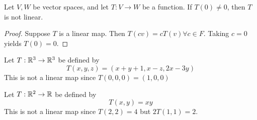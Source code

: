 \documentclass{article}
\begin{document}
\begin{theorem}
  Let $V, W$ be vector spaces, and let $T: V \to W$ be a function. If $T(0) \neq 0$, then $T$ is not linear.
\end{theorem}
\begin{proof}
  Suppose $T$ is a linear map. Then $T(cv) = cT(v) \forall c \in F$. Taking $c = 0$ yields $T(0) = 0$.
\end{proof}
\begin{example}
  Let $T: \mathbb{R}^3 \to \mathbb{R}^3$ be defined by \[
    T(x, y, z) = (x + y + 1, x-z, 2x-3y)
  \]
  This is not a linear map since $T(0, 0, 0) = (1, 0, 0)$
\end{example}
\begin{example}
  Let $T: \mathbb{R}^2 \to \mathbb{R}$ be defined by \[
    T(x, y) = xy
  \]
  This is not a linear map since $T(2, 2) = 4$ but $2T(1, 1) = 2$.
\end{example}
\end{document}
